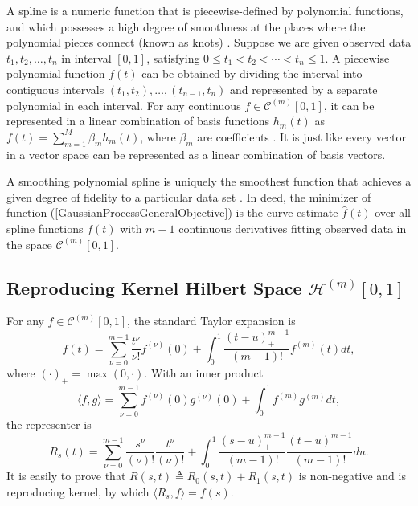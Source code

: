 A spline is a numeric function that is piecewise-defined by polynomial functions, and which possesses a high degree of smoothness at the places where the polynomial pieces connect (known as knots) \cite{judd1998numerical} \cite{chen2009feedback}. Suppose we are given observed data $t_1,t_2, \ldots, t_n$ in interval $[0,1]$, satisfying $0\leq t_1< t_2 < \cdots <t_n \leq 1$. A piecewise polynomial function $f(t)$ can be obtained by dividing the interval into contiguous intervals $(t_1,t_2),\ldots,(t_{n-1},t_n)$ and represented by a separate polynomial in each interval. For any continuous $f\in \mathcal{C}^{(m)}[0,1]$, it can be represented in a linear combination of basis functions $h_m(t)$ as $f(t) =\sum_{m=1}^{M}\beta_mh_m(t)$, where $\beta_m$ are coefficients \cite{ellis2009}. It is just like every vector in a vector space can be represented as a linear combination of basis vectors. 



A smoothing polynomial spline is uniquely the smoothest function that achieves a given degree of fidelity to a particular data set \cite{whittaker1922new}. In deed, the minimizer of function (\ref{GaussianProcessGeneralObjective}) is the curve estimate $\hat{f}(t)$ over all spline functions $f(t)$ with $m-1$ continuous derivatives fitting observed data in the space $\mathcal{C}^{(m)}[0,1]$. 


\subsection{Reproducing Kernel Hilbert Space $\mathcal{H}^{(m)}[0,1]$}

For any $f\in \mathcal{C}^{(m)}[0,1]$, the standard Taylor expansion is  
\begin{equation}
f(t) = \sum_{\nu=0}^{m-1}\frac{t^\nu}{\nu!}f^{(\nu)}(0) + \int_{0}^{1}\frac{(t-u)_+^{m-1}}{(m-1)!}f^{(m)}(t)dt,
\end{equation}
where $(\cdot)_+ =\max(0, \cdot)$. With an inner product 
\begin{equation}
\langle f,g \rangle = \sum_{\nu=0}^{m-1}f^{(\nu)}(0)g^{(\nu)}(0) +  \int_{0}^{1}f^{(m)} g^{(m)}dt,
\end{equation}
the representer is 
\begin{equation}
R_s(t) =\sum_{\nu=0}^{m-1} \frac{s^{\nu}}{(\nu)!} \frac{t^{\nu}}{(\nu)!} +\int_0^1\frac{ (s-u)_+^{m-1}}{(m-1)!} \frac{ (t-u)_+^{m-1}}{(m-1)!} du. 
\end{equation}
It is easily to prove that $R(s,t)\triangleq R_0(s,t)+R_1(s,t)$ is non-negative and is reproducing kernel, by which $\langle R_s,f \rangle=f(s)$. 

